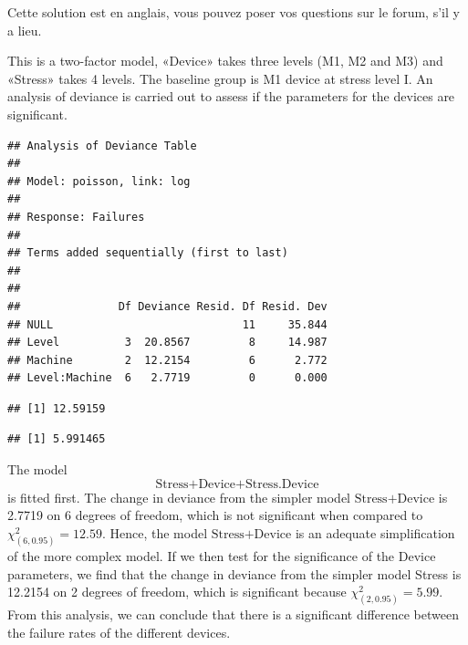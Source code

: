 \begin{solution}{5.7}
Cette solution est en anglais, vous pouvez poser vos questions sur le forum, s'il y a lieu.

This is a two-factor model, «Device» takes three levels (M1, M2 and M3) and «Stress» takes 4 levels. The baseline group is M1 device at stress level I. An analysis of deviance is carried out to assess if the parameters for the devices are significant.

\begin{knitrout}
\color{fgcolor}\begin{kframe}
\begin{alltt}
 \hlkwb{<-} \hlopt{~}\hlopt{*}
\end{alltt}
\begin{verbatim}
## Analysis of Deviance Table
##
## Model: poisson, link: log
##
## Response: Failures
##
## Terms added sequentially (first to last)
##
##
##               Df Deviance Resid. Df Resid. Dev
## NULL                             11     35.844
## Level          3  20.8567         8     14.987
## Machine        2  12.2154         6      2.772
## Level:Machine  6   2.7719         0      0.000
\end{verbatim}
\begin{alltt}
\hlstd{(}\hlstd{,} \hlstd{)}
\end{alltt}
\begin{verbatim}
## [1] 12.59159
\end{verbatim}
\begin{alltt}
\hlstd{(}\hlstd{,} \hlstd{)}
\end{alltt}
\begin{verbatim}
## [1] 5.991465
\end{verbatim}
\end{kframe}
\end{knitrout}

The model $$\mbox{Stress+Device+Stress.Device}$$ is fitted first. The change in deviance from the simpler model $\mbox{Stress+Device}$ is 2.7719 on 6 degrees of freedom, which is not significant when compared to $\chi^{2}_{(6,0.95)}=12.59$. Hence, the model $\mbox{Stress+Device}$ is an adequate simplification of the more complex model. If we then test for the significance of the Device parameters, we find that the change in deviance from the simpler model Stress is 12.2154 on 2 degrees of freedom, which is significant because $\chi^{2}_{(2,0.95)}=5.99$. From this analysis, we can conclude that there is a significant difference between the failure rates of the different devices.
\end{solution}
